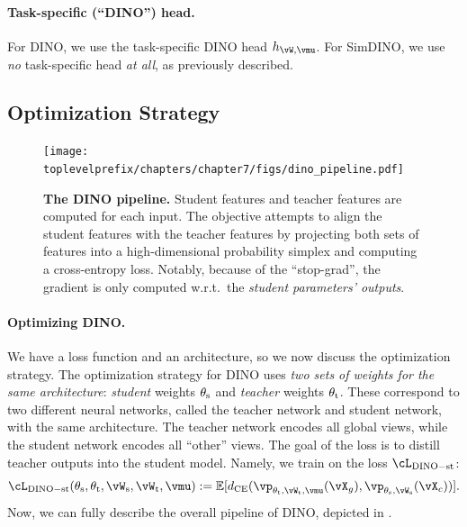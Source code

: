 \documentclass[../../book-main.tex]{subfiles}
\begin{document}
\paragraph{Task-specific (``DINO'') head.} For DINO, we use the task-specific DINO head \(h_{\vW, \vmu}\). For SimDINO, we use \textit{no} task-specific head \textit{at all}, as previously described.

\subsection{Optimization Strategy}\label{sub:contrastive_learning_optimization}

\begin{figure}
    \centering 
    \texttt{[image: \\toplevelprefix/chapters/chapter7/figs/dino\_pipeline.pdf]}
    \caption{\small \textbf{The DINO pipeline.} Student features and teacher features are computed for each input. The objective attempts to align the student features with the teacher features by projecting both sets of features into a high-dimensional probability simplex and computing a cross-entropy loss. Notably, because of the ``stop-grad'', the gradient is only computed w.r.t.~the \textit{student parameters' outputs}.}
    \label{fig:dino_pipeline}
\end{figure}

\paragraph{Optimizing DINO.} We have a loss function and an architecture, so we now discuss the optimization strategy. The optimization strategy for DINO uses \textit{two sets of weights for the same architecture}: \textit{student} weights \(\theta_{\mathrm{s}}\) and \textit{teacher} weights \(\theta_{\mathrm{t}}\). These correspond to two different neural networks, called the teacher network and student network, with the same architecture. The teacher network encodes all global views, while the student network encodes all ``other'' views. The goal of the loss is to distill teacher outputs into the student model. Namely, we train on the loss \(\cL_{\dino{}-\student\teacher}\):
\begin{equation}\label{eq:dino_loss_teacherstudent}
    \cL_{\dino{}-\student\teacher}(\theta_{\student}, \theta_{\teacher}, \vW_{\student}, \vW_{\teacher}, \vmu) := \Ex[d_{\CE}(\vp_{\theta_{\teacher}, \vW_{\teacher}, \vmu}(\vX_{g}), \vp_{\theta_{\student}, \vW_{\student}}(\vX_{c}))].
\end{equation}
Now, we can fully describe the overall pipeline of DINO, depicted in .
\end{document}
